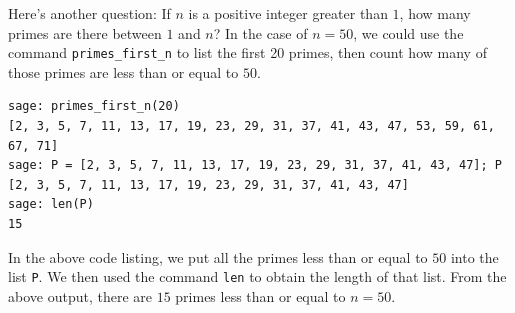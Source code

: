 Here's another question: If $n$ is a positive integer greater than
$1$, how many primes are there between $1$ and $n$? In the case of
$n = 50$, we could use the command \verb!primes_first_n! to list the
first 20 primes, then count how many of those primes are less than or
equal to $50$.
%
\begin{lstlisting}
sage: primes_first_n(20)
[2, 3, 5, 7, 11, 13, 17, 19, 23, 29, 31, 37, 41, 43, 47, 53, 59, 61, 67, 71]
sage: P = [2, 3, 5, 7, 11, 13, 17, 19, 23, 29, 31, 37, 41, 43, 47]; P
[2, 3, 5, 7, 11, 13, 17, 19, 23, 29, 31, 37, 41, 43, 47]
sage: len(P)
15
\end{lstlisting}
%
In the above code listing, we put all the primes less than or equal to
$50$ into the list \verb!P!. We then used the command \verb!len! to
obtain the length of that list. From the above output, there are $15$
primes less than or equal to $n = 50$.

